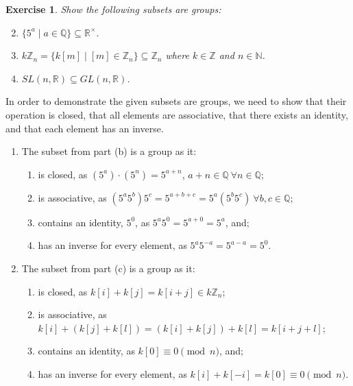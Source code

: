 \documentclass[12pt]{article}
\newtheorem{exer}{Exercise}
\numberwithin{problem}{section} %
\numberwithin{defn}{section} %
\numberwithin{thm}{section} %
\numberwithin{exer}{section} %
\numberwithin{lma}{section} %
\numberwithin{crlly}{section} %
\theoremstyle{remark}  %
\newenvironment{answer}
    {\begin{adjustwidth}{0pt}{0pt}}
    {\end{adjustwidth}}
\begin{document}
\setcounter{exer}{52}
\begin{exer}
    Show the following subsets are groups:
    \begin{enumerate}[label=(\alph*)]
        \setcounter{enumi}{1}
        \item $\{5^a\mid a \in \mathbb{Q}\} \subseteq \mathbb{R}^\times$.
        \item $k\mathbb{Z}_n=\{k[m]\mid[m]\in\mathbb{Z}_n\}\subseteq \mathbb{Z}_n$ where $k\in \mathbb{Z}$ and $n\in\mathbb{N}$.
        \setcounter{enumi}{6}
        \item $SL(n,\mathbb{R})\subseteq GL(n,\mathbb{R})$.       
    \end{enumerate}
\end{exer}
\begin{answer}
    In order to demonstrate the given subsets are groups, we need to show that their operation is closed, that all elements are associative, that there exists an identity, and that each element has an inverse. 
    \begin{enumerate}[label=(\alph*)]
        \item The subset from part (b) is a group as it:
        \begin{enumerate}[label=(\roman*)]
            \item is closed, as $(5^a)\cdot(5^n) = 5^{a+n}$, $a+n\in\mathbb{Q}\ \forall n\in \mathbb{Q}$;
            \item is associative, as $(5^{a}5^{b})5^{c}=5^{a+b+c}=5^{a}(5^{b}5^{c})\ \forall b,c\in\mathbb{Q}$;
            \item contains an identity, $5^0$, as $5^a5^0=5^{a+0}=5^{a}$, and;
            \item has an inverse for every element, as $5^a5^{-a}=5^{a-a}=5^0$.
        \end{enumerate}
        \item The subset from part (c) is a group as it:
        \begin{enumerate}[label=(\roman*)]
            \item is closed, as $k[i]+k[j]=k[i+j]\in k\mathbb{Z}_n$;
            \item is associative, as $k[i]+(k[j]+k[l]) = (k[i]+k[j])+k[l] = k[i + j + l]$;
            \item contains an identity, as $k[0]\equiv 0 \pmod{n}$, and;
            \item has an inverse for every element, as $k[i]+k[-i]=k[0] \equiv 0 \pmod{n}$.
        \end{enumerate}

\end{enumerate}
\end{answer}
\end{document}
